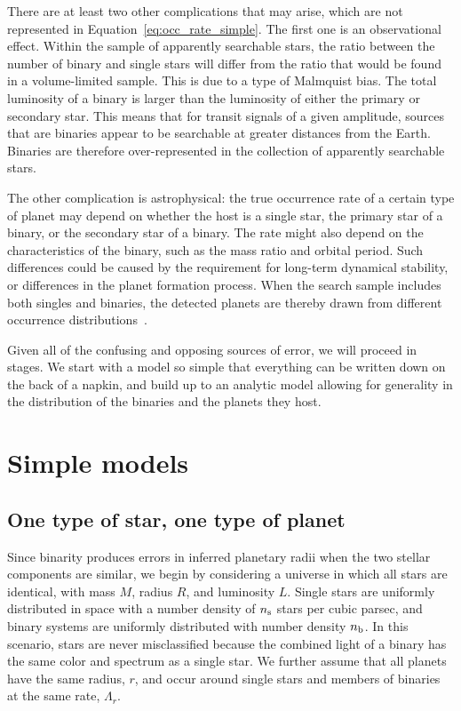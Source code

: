 \documentclass[12pt,modern,trackchanges]{aastex61}
\newcommand{\s}{_{\rm s}}
\renewcommand{\b}{_{\rm b}}
\begin{document}
There are at least two other complications that may arise, which are
not represented in Equation~\ref{eq:occ_rate_simple}.  The first one
is an observational effect. Within the sample of apparently searchable
stars, the ratio between the number of binary and single stars will
differ from the ratio that would be found in a volume-limited sample.
This is due to a type of Malmquist bias.  The total luminosity of a
binary is larger than the luminosity of either the primary or
secondary star.  This means that for transit signals of a given
amplitude, sources that are binaries appear to be searchable at
greater distances from the Earth.  Binaries are therefore
over-represented in the collection of apparently searchable stars.

The other complication is astrophysical: the true occurrence rate of a
certain type of planet may depend on whether the host is a single
star, the primary star of a binary, or the secondary star of a binary.
The rate might also depend on the characteristics of the binary, such
as the mass ratio and orbital period.  Such differences could be
caused by the requirement for long-term dynamical stability, or
differences in the planet formation process.  When the search sample
includes both singles and binaries, the detected planets are thereby
drawn from different occurrence distributions~\citep[see][]{
  wang_occurrence_2015,kraus_impact_2016}.

Given all of the confusing and opposing sources of error, we will
proceed in stages.  We start with a model so simple that everything
can be written down on the back of a napkin, and build up to an
analytic model allowing for generality in the distribution of the
binaries and the planets they host.  



\section{Simple models}
\label{sec:simplest}

\subsection{One type of star, one type of planet}
\label{sec:model_1}

Since binarity produces  errors in inferred
planetary radii when the two stellar components are similar, we
begin by considering a universe in which
all stars are identical, with mass $M$, radius $R$, and luminosity
$L$.  Single stars are uniformly distributed in space with a number
density of $n\s$ stars per cubic parsec, and binary systems are
uniformly distributed with number density $n\b$.  In this scenario,
stars are never misclassified because the combined light of a binary
has the same color and spectrum as a single star.  We further assume
that all planets have the same radius, $r$, and occur around single
stars and members of binaries at the same rate, $\Lambda_r$.
\end{document}
